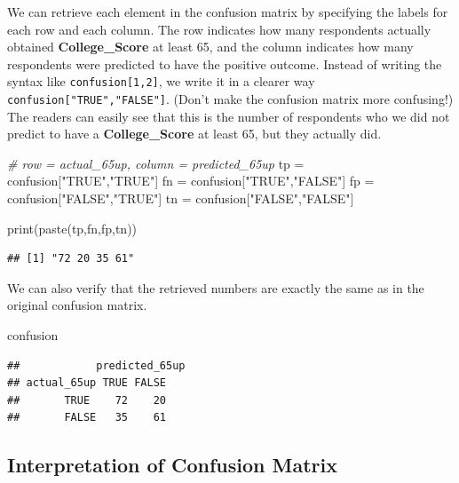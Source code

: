 \documentclass[
]{article}
\newenvironment{Shaded}{\begin{snugshade}}{\end{snugshade}}
\newcommand{\CommentTok}[1]{\textcolor[rgb]{0.56,0.35,0.01}{\textit{#1}}}
\newcommand{\FunctionTok}[1]{\textcolor[rgb]{0.00,0.00,0.00}{#1}}
\newcommand{\NormalTok}[1]{#1}
\newcommand{\OtherTok}[1]{\textcolor[rgb]{0.56,0.35,0.01}{#1}}
\newcommand{\StringTok}[1]{\textcolor[rgb]{0.31,0.60,0.02}{#1}}
\begin{document}
We can retrieve each element in the confusion matrix by specifying the
labels for each row and each column. The row indicates how many
respondents actually obtained \textbf{College\_Score} at least 65, and
the column indicates how many respondents were predicted to have the
positive outcome. Instead of writing the syntax like
\texttt{confusion{[}1,2{]}}, we write it in a clearer way
\texttt{confusion{[}"TRUE","FALSE"{]}}. (Don't make the confusion matrix
more confusing!) The readers can easily see that this is the number of
respondents who we did not predict to have a \textbf{College\_Score} at
least 65, but they actually did.

\begin{Shaded}
\begin{Highlighting}[]
\CommentTok{\# row = actual\_65up, column = predicted\_65up}
\NormalTok{tp }\OtherTok{=}\NormalTok{ confusion[}\StringTok{"TRUE"}\NormalTok{,}\StringTok{"TRUE"}\NormalTok{]}
\NormalTok{fn }\OtherTok{=}\NormalTok{ confusion[}\StringTok{"TRUE"}\NormalTok{,}\StringTok{"FALSE"}\NormalTok{]}
\NormalTok{fp }\OtherTok{=}\NormalTok{ confusion[}\StringTok{"FALSE"}\NormalTok{,}\StringTok{"TRUE"}\NormalTok{]}
\NormalTok{tn }\OtherTok{=}\NormalTok{ confusion[}\StringTok{"FALSE"}\NormalTok{,}\StringTok{"FALSE"}\NormalTok{]}

\FunctionTok{print}\NormalTok{(}\FunctionTok{paste}\NormalTok{(tp,fn,fp,tn))}
\end{Highlighting}
\end{Shaded}

\begin{verbatim}
## [1] "72 20 35 61"
\end{verbatim}

We can also verify that the retrieved numbers are exactly the same as in
the original confusion matrix.

\begin{Shaded}
\begin{Highlighting}[]
\NormalTok{confusion}
\end{Highlighting}
\end{Shaded}

\begin{verbatim}
##            predicted_65up
## actual_65up TRUE FALSE
##       TRUE    72    20
##       FALSE   35    61
\end{verbatim}

\hypertarget{interpretation}{%
\subsection{Interpretation of Confusion Matrix}\label{interpretation}}
\end{document}

